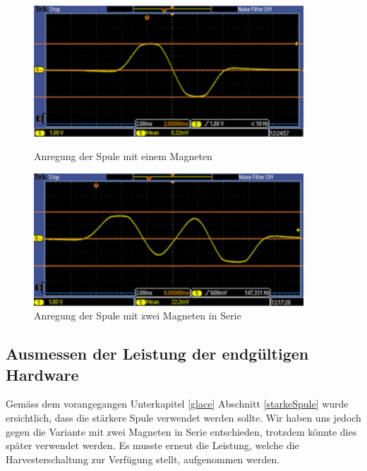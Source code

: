 \begin{figure}[ht]
 \begin{minipage}[t]{0.5\textwidth}
  \includegraphics[width=0.9\textwidth]{3Vorgehen/imag/zweiMagneteInSerie_links.png}
  \caption{Anregung der Spule mit einem Magneten}
  \label{zweiMagneteInSerie} 
 \end{minipage}
 \begin{minipage}[t]{0.5\textwidth}
  \includegraphics[width=0.9\textwidth]{3Vorgehen/imag/zweiMagneteInSerie_rechts.png}
  \caption{Anregung der Spule mit zwei Magneten in Serie}
  \label{manu}
 \end{minipage}
\end{figure}


\subsection{Ausmessen der Leistung der endgültigen Hardware}

Gemäss dem vorangegangen Unterkapitel \ref{glace} Abschnitt \ref{starkeSpule} wurde ersichtlich, dass die stärkere Spule verwendet werden sollte. Wir haben uns jedoch gegen die Variante mit zwei Magneten in Serie entschieden, trotzdem könnte dies später verwendet werden. Es musste erneut die Leistung, welche die Harvesterschaltung zur Verfügung stellt, aufgenommen werden.


